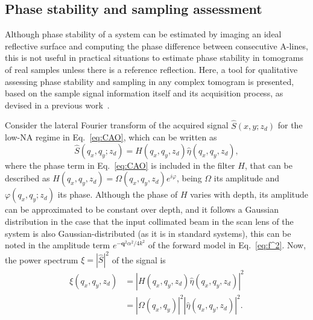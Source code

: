 \subsection{Phase stability and sampling assessment}

Although phase stability of a system can be estimated by imaging an ideal reflective surface and computing the phase difference between consecutive A-lines, this is not useful in practical situations to estimate phase stability in tomograms of real samples unless there is a reference reflection. Here, a tool for qualitative assessing phase stability and sampling in any complex tomogram is presented, based on the sample signal information itself and its acquisition process, as devised in a previous work~\cite{Cuartas-Velez2017_Formacion}.

Consider the lateral Fourier transform of the acquired signal $\hat{S}(x,y;z_d)$ for the low-NA regime in Eq.~\eqref{eq:CAO}, which can be written as
\begin{equation}
    \hat{S}(q_x, q_y; z_d) = H(q_x, q_y, z_d) \hat{\eta}(q_x, q_y, z_d),
\end{equation}
where the phase term in Eq.~\eqref{eq:CAO} is included in the filter $H$, that can be described as $H(q_x,q_y, z_d)=\Omega(q_x, q_y, z_d)e^{i\varphi}$, being $\Omega$ its amplitude and $\varphi(q_x, q_y; z_d)$ its phase. Although the phase of $H$ varies with depth, its amplitude can be approximated to be constant over depth, and it follows a Gaussian distribution in the case that the input collimated beam in the scan lens of the system is also Gaussian-distributed (as it is in standard systems), this can be noted in the amplitude term $e^{-\mathbf{q}^2\alpha^2/4k^2}$ of the forward model in Eq.~\eqref{eq:f^2}. Now, the power spectrum $\xi = |\hat{S}|^2$ of the signal is
\begin{align}
    \xi(q_x, q_y, z_d) &= |H(q_x, q_y, z_d) \hat{\eta}( q_x, q_y, z_d)|^2 \nonumber\\
    &= |\Omega(q_x, q_y)|^2 |\hat{\eta}(q_x, q_y, z_d)|^2.
\end{align}


